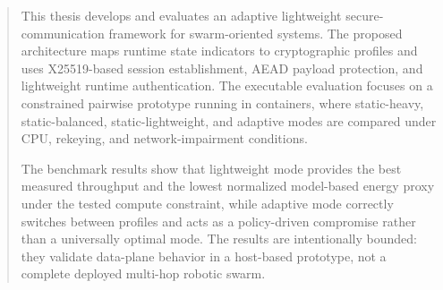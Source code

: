 \begin{abstract}
This thesis develops and evaluates an adaptive lightweight secure-communication
framework for swarm-oriented systems. The proposed architecture maps runtime
state indicators to cryptographic profiles and uses X25519-based session
establishment, AEAD payload protection, and lightweight runtime authentication.
The executable evaluation focuses on a constrained pairwise prototype running in
containers, where static-heavy, static-balanced, static-lightweight, and
adaptive modes are compared under CPU, rekeying, and network-impairment
conditions.

The benchmark results show that lightweight mode provides the best measured
throughput and the lowest normalized model-based energy proxy under the tested
compute constraint, while adaptive mode correctly switches between profiles and
acts as a policy-driven compromise rather than a universally optimal mode. The
results are intentionally bounded: they validate data-plane behavior in a
host-based prototype, not a complete deployed multi-hop robotic swarm.
\end{abstract}
